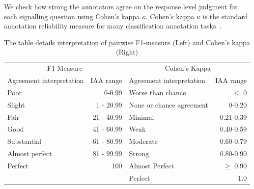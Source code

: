\documentclass[sn-mathphys,Numbered]{sn-jnl}%
\theoremstyle{thmstyleone}%
\theoremstyle{thmstyletwo}%
\theoremstyle{thmstylethree}%
\begin{document}
We check how strong the annotators agree on the response level judgment for each signalling question using Cohen's kappa $\kappa$.
Cohen's kappa $\kappa$ is the standard annotation reliability measure for many classification annotation tasks~\cite{mchugh2012interrater}.
%
%
%
\begin{center}
 \begin{table}[htb]
   \caption{The table details interpretation of pairwise F1-measure (Left) and Cohen's kappa (Right)}\label{tab:iaa_interpret}
 \centering
    \begin{tabular}{lr|lr}
    \toprule
    \multicolumn{2}{c|}{F1 Measure} & \multicolumn{2}{c}{Cohen's Kappa}  \\ 
    Agreement interpretation & IAA range & Agreement interpretation & IAA range \\ 
    \midrule
        Poor & 0-0.99 &  Worse than chance & $\leq$ 0\\ 
        Slight & 1 - 20.99 &  None or chance agreement & 0-0.20\\ 
        Fair & 21 - 40.99 &  Minimal & 0.21-0.39\\ 
        Good & 41 - 60.99 & Weak & 0.40-0.59\\ 
        Substantial & 61 - 80.99 & Moderate & 0.60-0.79 \\ 
        Almost perfect & 81 - 99.99 & Strong & 0.80-0.90 \\ 
        Perfect & 100 & Almost Perfect & $\geq$ 0.90 \\ 
         & & Perfect & 1.0 \\ 
    \bottomrule
    \end{tabular}
 \end{table}   
\end{center}
%
%
%
\end{document}
